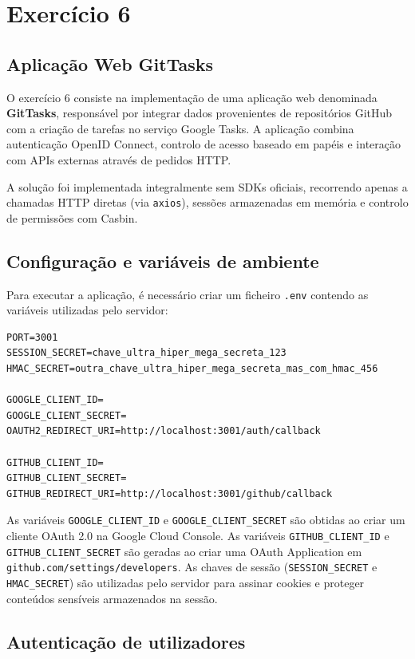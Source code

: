 \chapter{Exercício 6}
\label{cha:exercise_6}

\section{Aplicação Web GitTasks}

O exercício 6 consiste na implementação de uma aplicação web denominada \textbf{GitTasks}, responsável por integrar dados provenientes de repositórios GitHub com a criação de tarefas no serviço Google Tasks. A aplicação combina autenticação OpenID Connect, controlo de acesso baseado em papéis e interação com APIs externas através de pedidos HTTP.

A solução foi implementada integralmente sem SDKs oficiais, recorrendo apenas a chamadas HTTP diretas (via \texttt{axios}), sessões armazenadas em memória e controlo de permissões com Casbin.

\section{Configuração e variáveis de ambiente}

Para executar a aplicação, é necessário criar um ficheiro \texttt{.env} contendo as variáveis utilizadas pelo servidor:

\begin{verbatim}
PORT=3001
SESSION_SECRET=chave_ultra_hiper_mega_secreta_123
HMAC_SECRET=outra_chave_ultra_hiper_mega_secreta_mas_com_hmac_456

GOOGLE_CLIENT_ID=
GOOGLE_CLIENT_SECRET=
OAUTH2_REDIRECT_URI=http://localhost:3001/auth/callback

GITHUB_CLIENT_ID=
GITHUB_CLIENT_SECRET=
GITHUB_REDIRECT_URI=http://localhost:3001/github/callback
\end{verbatim}

As variáveis \texttt{GOOGLE\_CLIENT\_ID} e \texttt{GOOGLE\_CLIENT\_SECRET} são obtidas ao criar um cliente OAuth 2.0 na Google Cloud Console.  
As variáveis \texttt{GITHUB\_CLIENT\_ID} e \texttt{GITHUB\_CLIENT\_SECRET} são geradas ao criar uma OAuth Application em \texttt{github.com/settings/developers}.  
As chaves de sessão (\texttt{SESSION\_SECRET} e \texttt{HMAC\_SECRET}) são utilizadas pelo servidor para assinar cookies e proteger conteúdos sensíveis armazenados na sessão.

\section{Autenticação de utilizadores}

